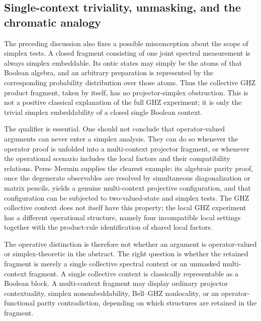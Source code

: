 \documentclass[aps,pra,twocolumn,superscriptaddress,nofootinbib]{revtex4-2}
\begin{document}
\subsection{Single-context triviality, unmasking, and the chromatic analogy}
\label{subsec:ghz-unmasking}

The preceding discussion also fixes a possible misconception about the scope of simplex tests.  A closed fragment consisting of one joint spectral measurement is always simplex embeddable.  Its ontic states may simply be the atoms of that Boolean algebra, and an arbitrary preparation is represented by the corresponding probability distribution over those atoms.  Thus the collective GHZ product fragment, taken by itself, has no projector-simplex obstruction.  This is not a positive classical explanation of the full GHZ experiment; it is only the trivial simplex embeddability of a closed single Boolean context.

The qualifier is essential.  One should not conclude that operator-valued arguments can never enter a simplex analysis.  They can do so whenever the operator proof is unfolded into a multi-context projector fragment, or whenever the operational scenario includes the local factors and their compatibility relations.  Peres--Mermin supplies the clearest example: its algebraic parity proof, once the degenerate observables are resolved by simultaneous diagonalization or matrix pencils, yields a genuine multi-context projective configuration, and that configuration can be subjected to two-valued-state and simplex tests.  The GHZ collective context does not itself have this property; the local GHZ experiment has a different operational structure, namely four incompatible local settings together with the product-rule identification of shared local factors.

The operative distinction is therefore not whether an argument is operator-valued or simplex-theoretic in the abstract.  The right question is whether the retained fragment is merely a single collective spectral context or an unmasked multi-context fragment.  A single collective context is classically representable as a Boolean block.  A multi-context fragment may display ordinary projector contextuality, simplex nonembeddability, Bell--GHZ nonlocality, or an operator-functional parity contradiction, depending on which structures are retained in the fragment.
\end{document}
